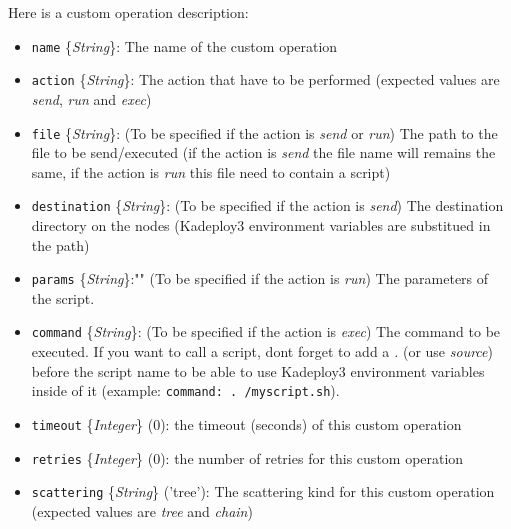 \documentclass[a4wide,10pt,oneside]{book}
\newcommand{\yfield}[2]{\texttt{#1} {\small\{{\emph{#2}}\}}:}
\newcommand{\yfieldd}[3]{\texttt{#1} {\small\{{\emph{#2}}\}} {\small(}#3{\small)}:}
\begin{document}
Here is a custom operation description:
\begin{itemize}
  \item \yfield{name}{String} The name of the custom operation
  \item \yfield{action}{String} The action that have to be performed (expected values are \emph{send}, \emph{run} and \emph{exec})
  \item \yfield{file}{String} \small{(To be specified if the action is \emph{send} or \emph{run})} The path to the file to be send/executed (if the action is \emph{send} the file name will remains the same, if the action is \emph{run} this file need to contain a script)
  \item \yfield{destination}{String} \small{(To be specified if the action is \emph{send})} The destination directory on the nodes (Kadeploy3 environment variables are substitued in the path)
  \item \yfield{params}{String}{""} \small{(To be specified if the action is \emph{run})} The parameters of the script.
  \item \yfield{command}{String} \small{(To be specified if the action is \emph{exec})} The command to be executed. If you want to call a script, dont forget to add a \emph{.} (or use \emph{source}) before the script name to be able to use Kadeploy3 environment variables inside of it (example: \texttt{command: . /myscript.sh}).
  \item \yfieldd{timeout}{Integer}{0} the timeout (seconds) of this custom operation
  \item \yfieldd{retries}{Integer}{0} the number of retries for this custom operation
  \item \yfieldd{scattering}{String}{'tree'} The scattering kind for this custom operation (expected values are \emph{tree} and \emph{chain})
\end{itemize}
\end{document}
